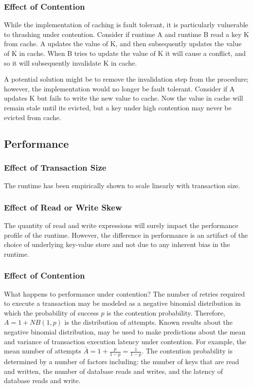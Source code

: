 \documentclass[12pt]{article}
\begin{document}
    \subsubsection{Effect of Contention}
      While the implementation of caching is fault tolerant, it is particularly vulnerable to
      thrashing under contention. Consider if runtime A and runtime B read a key K from cache. A
      updates the value of K, and then subsequently updates the value of K in cache. When B tries to
      update the value of K it will cause a conflict, and so it will subsequently invalidate K in
      cache.

      A potential solution might be to remove the invalidation step from the procedure; however, the
      implementation would no longer be fault tolerant. Consider if A updates K but fails to write
      the new value to cache. Now the value in cache will remain stale until its evicted, but a key
      under high contention may never be evicted from cache.

  \subsection{Performance}

    \subsubsection{Effect of Transaction Size}
      The runtime has been empirically shown to scale linearly with transaction size.

    \subsubsection{Effect of Read or Write Skew}
      The quantity of read and write expressions will surely impact the performance profile of the
      runtime. However, the difference in performance is an artifact of the choice of underlying
      key-value store and not due to any inherent bias in the runtime.

    \subsubsection{Effect of Contention}
      What happens to performance under contention? The number of retries required to execute a
      transaction may be modeled as a negative binomial distribution in which the probability of
      success $p$ is the contention probability. Therefore, $A = 1 + NB(1, p)$ is the distribution
      of attempts. Known results about the negative binomial distribution, may be used to make
      predictions about the mean and variance of transaction execution latency under contention. For
      example, the mean number of attempts $\bar{A} = 1 + \frac{p}{1 - p} = \frac{1}{1 - p}$. The
      contention probability is determined by a number of factors including: the number of keys that
      are read and written, the number of database reads and writes, and the latency of database
      reads and write.
\end{document}
